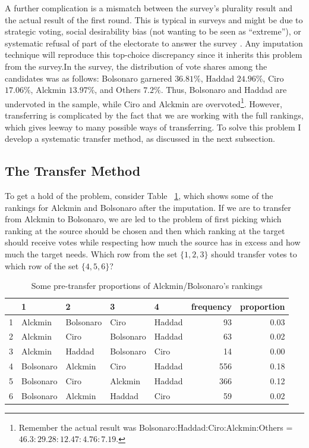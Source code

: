 \documentclass[hidelinks,11pt]{article} \usepackage[utf8]{inputenc}
\begin{document}
A further complication is a mismatch between the survey's plurality result and
the actual result of the first round. This is typical in surveys and might be
due to strategic voting, social desirability bias (not wanting to be seen as
``extreme''), or systematic refusal of part of the electorate to answer the
survey \parencite{nishimura2016alternative}. Any imputation technique will
reproduce this top-choice discrepancy since it inherits this problem from the
survey.In the survey, the distribution of vote shares among the candidates was as follows: Bolsonaro garnered \(36.81\%\), Haddad \(24.96\%\), Ciro \(17.06\%\), Alckmin \(13.97\%\), and Others \(7.2\%\).
 Thus, Bolsonaro and Haddad are
undervoted in the sample, while Ciro and Alckmin are overvoted\footnote{Remember the actual result was Bolsonaro:Haddad:Ciro:Alckmin:Others = \(46.3 : 29.28 : 12.47 : 4.76 : 7.19 \).}. However,
transferring is complicated by the fact that we are working with the full
rankings, which gives leeway to many possible ways of transferring. To solve
this problem I develop a systematic transfer method, as discussed in the next
subsection.

\subsection{The Transfer Method}
To get a hold of the problem,  consider Table
~\ref{tbl:overunderex}, which shows some of the rankings for Alckmin and
Bolsonaro after the imputation. If we are to transfer from Alckmin to Bolsonaro,
we are led to the problem of first picking which ranking at the source should be
chosen and then which ranking at the target should receive votes while
respecting how much the source has in excess and how much the target needs.
Which row from the set \(\{1,2,3\}\) should transfer votes to which row of the
set \(\{4,5,6\}\)?

\begin{table}[!h] \centering %
\begin{tabular}{rllllrr} \hline & 1 & 2 & 3 & 4 & frequency & proportion \\
\hline 1 & Alckmin & Bolsonaro & Ciro & Haddad & 93 & 0.03 \\ 2 & Alckmin & Ciro
& Bolsonaro & Haddad & 63 & 0.02 \\ 3 & Alckmin & Haddad & Bolsonaro & Ciro & 14
& 0.00 \\ 4 & Bolsonaro & Alckmin & Ciro & Haddad & 556 & 0.18 \\ 5 & Bolsonaro
& Ciro & Alckmin & Haddad & 366 & 0.12 \\ 6 & Bolsonaro & Alckmin & Haddad &
Ciro & 59 & 0.02 \\ \hline
\end{tabular} %
\caption{Some pre-transfer proportions of Alckmin/Bolsonaro's rankings}
\label{tbl:overunderex}
\end{table}
\end{document}
